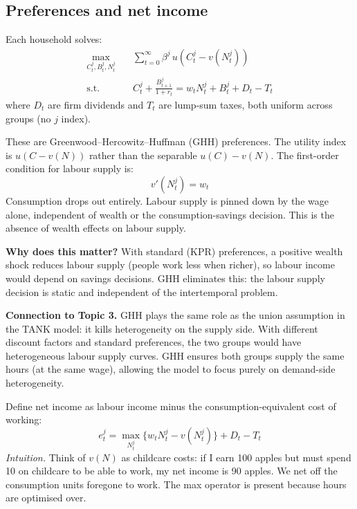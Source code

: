 \documentclass[11pt,a4paper]{article}
\begin{document}
\subsection{Preferences and net income}

Each household solves:
\begin{equation}
\begin{aligned}
    \max_{C_t^j, B_t^j, N_t^j} & \quad \sum_{t=0}^{\infty} \beta^j \, u\!\left(C_t^j - v(N_t^j)\right) \\
    \text{s.t.} & \quad C_t^j + \frac{B_{t+1}^j}{1+r_t} = w_t N_t^j + B_t^j + D_t - T_t
\end{aligned}
\end{equation}
where $D_t$ are firm dividends and $T_t$ are lump-sum taxes, both uniform across groups (no $j$ index).

These are Greenwood--Hercowitz--Huffman (GHH) preferences. The utility index is $u(C - v(N))$ rather than the separable $u(C) - v(N)$. The first-order condition for labour supply is:
\begin{equation}
v'(N_t^j) = w_t
\end{equation}
Consumption drops out entirely. Labour supply is pinned down by the wage alone, independent of wealth or the consumption-savings decision. This is the absence of wealth effects on labour supply.

\textbf{Why does this matter?} With standard (KPR) preferences, a positive wealth shock reduces labour supply (people work less when richer), so labour income would depend on savings decisions. GHH eliminates this: the labour supply decision is static and independent of the intertemporal problem.

\textbf{Connection to Topic 3.} GHH plays the same role as the union assumption in the TANK model: it kills heterogeneity on the supply side. With different discount factors and standard preferences, the two groups would have heterogeneous labour supply curves. GHH ensures both groups supply the same hours (at the same wage), allowing the model to focus purely on demand-side heterogeneity.

Define net income as labour income minus the consumption-equivalent cost of working:
\begin{equation}
e_t^j = \max_{N_t^j} \bigl\{w_t N_t^j - v(N_t^j)\bigr\} + D_t - T_t
\end{equation}
\textit{Intuition.} Think of $v(N)$ as childcare costs: if I earn 100 apples but must spend 10 on childcare to be able to work, my net income is 90 apples. We net off the consumption units foregone to work. The max operator is present because hours are optimised over.
\end{document}

